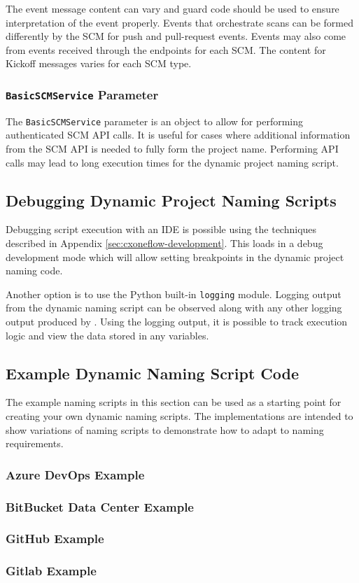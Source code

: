 The event message content can vary and guard code should be used to ensure interpretation of the event properly.
Events that orchestrate scans can be formed differently by the SCM for push and pull-request events.  Events may also
come from events received through the  endpoints for each SCM.  The content for Kickoff
messages varies for each SCM type.

\subsubsection{\texttt{BasicSCMService} Parameter}

The \texttt{BasicSCMService} parameter is an object to allow for performing authenticated SCM API calls.  It is useful for
cases where additional information from the SCM API is needed to fully form the project name.  Performing API calls may
lead to long execution times for the dynamic project naming script.

\subsection{Debugging Dynamic Project Naming Scripts}

Debugging script execution with an IDE is possible using the techniques described in Appendix \ref{sec:cxoneflow-development}.
This loads \cxoneflow in a debug development mode which will allow setting breakpoints in the dynamic project naming code.

Another option is to use the Python built-in \texttt{logging} module.  Logging output from the dynamic naming script can be
observed along with any other logging output produced by \cxoneflowns.  Using the logging output, it is possible to track
execution logic and view the data stored in any variables.

\subsection{Example Dynamic Naming Script Code}

The example naming scripts in this section can be used as a starting point for creating your own
dynamic naming scripts.  The implementations are intended to show variations of naming scripts to
demonstrate how to adapt to naming requirements.

\pagebreak
\subsubsection{Azure DevOps Example}


\pagebreak
\subsubsection{BitBucket Data Center Example}


\pagebreak
\subsubsection{GitHub Example}


\pagebreak
\subsubsection{Gitlab Example}





